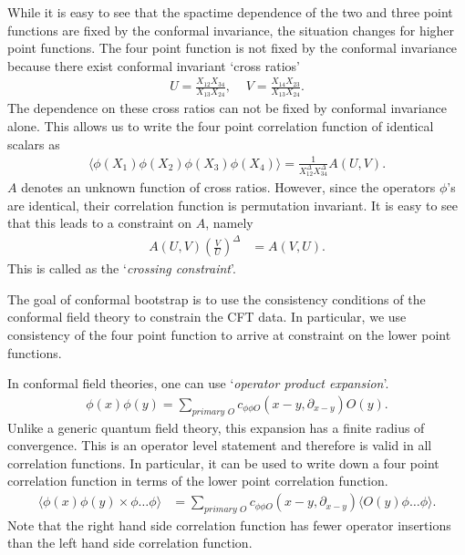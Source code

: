 While it is easy to see that the spactime dependence of the two and three point functions are fixed by the conformal invariance, the situation changes for higher point functions.
The four point function is not fixed by the conformal invariance because there exist conformal invariant `cross ratios'
\begin{align}
  U=\frac{X_{12} X_{34}}{X_{13} X_{24}}, \,\, & V= \frac{X_{14}X_{23}}{X_{13}X_{24}}.
  \label{eq:crossRatios}
\end{align}
The dependence on these cross ratios can not  be fixed by conformal invariance alone.
This allows us to write the four point correlation function of identical scalars as
\begin{align}
  \langle\phi\left( X_1 \right) \phi\left( X_2 \right)\phi\left( X_3 \right) \phi\left( X_4 \right) \rangle = \frac{1}{X_{12}^\Delta X_{34}^\Delta} A\left( U,V \right).
\end{align}
$ A $ denotes an unknown function of cross ratios.
However, since the operators $ \phi $'s are identical, their correlation function is permutation invariant.
It is easy to see that this leads to a constraint on $ A $, namely \cite{Poland:2018epd}
\begin{align}
  A\left( U,V \right) \left( \frac{V}{U} 	 \right)^\Delta & = A\left( V,U \right) .
\end{align}
This is called as the `\emph{crossing constraint}'.

The goal of conformal bootstrap is to use the consistency conditions of the conformal field theory to constrain the CFT data.
In particular, we use consistency of the four point function to arrive at constraint on the lower point functions.

In conformal field theories, one can use `\emph{operator product expansion}'.
\begin{align}
  \phi\left( x \right) \phi\left( y \right) = \sum_{\textit{primary } O} c_{\phi \phi O}\left( x-y,\partial_{x-y} \right) O\left( y \right)	.
\end{align}
Unlike a generic quantum field theory, this expansion has a finite radius of convergence.
This is an operator level statement and therefore is valid in all correlation functions.
In particular, it can be used to write down a four point correlation function in terms of the lower point correlation function.
\begin{align}
  \langle\phi\left( x \right) \phi \left( y \right)\times \phi \dots \phi \rangle &
  = \sum_{\textit{primary } O} c_{\phi \phi O}\left( x-y,\partial_{x-y} \right) \langle O\left( y \right) \phi \dots \phi\rangle	.
\end{align}
Note that the right hand side correlation function has fewer operator insertions than the left hand side correlation function.

